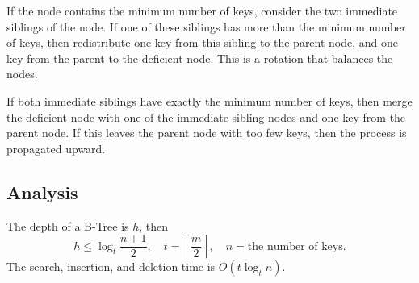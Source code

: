 If the node contains the minimum number of keys, consider the two immediate siblings of the node. If one of these siblings has more than the minimum number of keys, then redistribute one key from this sibling to the parent node, and one key from the parent to the deficient node. This is a rotation that balances the nodes. 

If both immediate siblings have exactly the minimum number of keys, then merge the deficient node with one of the immediate sibling nodes and one key from the parent node. If this leaves the parent node with too few keys, then the process is propagated upward.

\subsection{Analysis}
The depth of a B-Tree is \(h\), then  
\[
  h \leq \log_t \frac{n + 1}{2}, \quad t = \left\lceil \frac{m}{2} \right\rceil, \quad n = \text{the number of keys}.  
\]
The search, insertion, and deletion time is \(O(t \log_t n)\).

